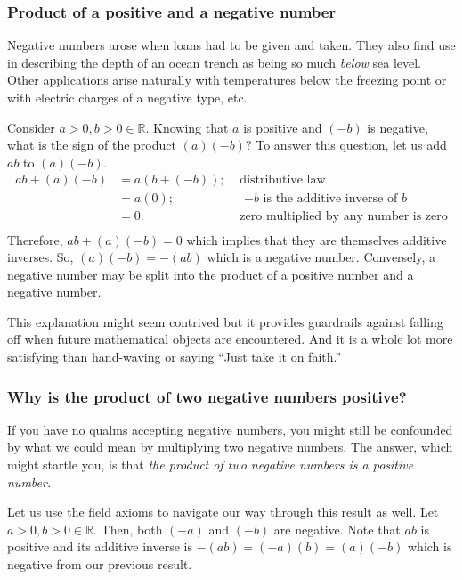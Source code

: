 \documentclass[
  a4paper,
]{article}
\begin{document}
\hypertarget{product-of-a-positive-and-a-negative-number}{%
\subsubsection{Product of a positive and a negative
number}\label{product-of-a-positive-and-a-negative-number}}

Negative numbers arose when loans had to be given and taken. They also
find use in describing the depth of an ocean trench as being so much
\emph{below} sea level. Other applications arise naturally with
temperatures below the freezing point or with electric charges of a
negative type, etc.

Consider \(a > 0, b > 0 \in \mathbb{R}\). Knowing that \(a\) is positive
and \((-b)\) is negative, what is the sign of the product \((a)(-b)\)?
To answer this question, let us add \(ab\) to \((a)(-b)\). \[
\begin{aligned}
ab + (a)(-b) &= a(b + (-b)); & \mbox{ distributive law}\\
&= a(0); & \mbox{ $-b$ is the additive inverse of $b$}\\
&=0. & \mbox{ zero multiplied by any number is zero}\\
\end{aligned}
\] Therefore, \(ab + (a)(-b) = 0\) which implies that they are
themselves additive inverses. So, \((a)(-b) = -(ab)\) which is a
negative number. Conversely, a negative number may be split into the
product of a positive number and a negative number.

This explanation might seem contrived but it provides guardrails against
falling off when future mathematical objects are encountered. And it is
a whole lot more satisfying than hand-waving or saying ``Just take it on
faith.''

\hypertarget{why-is-the-product-of-two-negative-numbers-positive}{%
\subsubsection{Why is the product of two negative numbers
positive?}\label{why-is-the-product-of-two-negative-numbers-positive}}

If you have no qualms accepting negative numbers, you might still be
confounded by what we could mean by multiplying two negative numbers.
The answer, which might startle you, is that \emph{the product of two
negative numbers is a positive number.}

Let us use the field axioms to navigate our way through this result as
well. Let \(a > 0, b > 0 \in \mathbb{R}\). Then, both \((-a)\) and
\((-b)\) are negative. Note that \(ab\) is positive and its additive
inverse is \(-(ab) = (-a)(b) = (a)(-b)\) which is negative from our
previous result.
\end{document}

